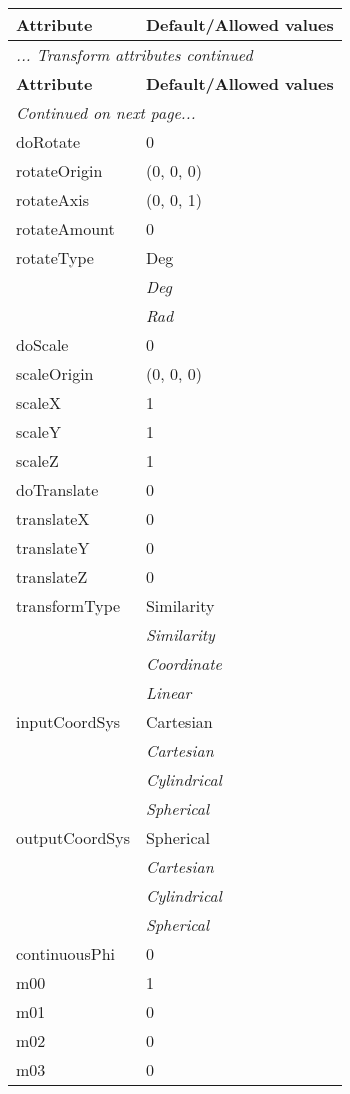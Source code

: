 \documentclass[10pt,a4paper]{report}
\begin{document}
\begin{longtable}{ll}
{\bf Attribute} & {\bf Default/Allowed values} \\
\hline \hline
\endfirsthead
\multicolumn{2}{l}{{\it ... Transform attributes continued}} \\
{\bf Attribute} & {\bf Default/Allowed values} \\
\hline \hline
\endhead
\hline
\multicolumn{2}{l}{{\it Continued on next page...}} \\
\endfoot
\hline
\endlastfoot

doRotate  &  0 \\
rotateOrigin  &  (0, 0, 0) \\
rotateAxis  &  (0, 0, 1) \\
rotateAmount  &  0 \\
rotateType  &  Deg   \\
 & {\it  Deg} \\
 & {\it  Rad} \\
doScale  &  0 \\
scaleOrigin  &  (0, 0, 0) \\
scaleX  &  1 \\
scaleY  &  1 \\
scaleZ  &  1 \\
doTranslate  &  0 \\
translateX  &  0 \\
translateY  &  0 \\
translateZ  &  0 \\
transformType  &  Similarity   \\
 & {\it  Similarity} \\
 & {\it  Coordinate} \\
 & {\it  Linear} \\
inputCoordSys  &  Cartesian   \\
 & {\it  Cartesian} \\
 & {\it  Cylindrical} \\
 & {\it  Spherical} \\
outputCoordSys  &  Spherical   \\
 & {\it  Cartesian} \\
 & {\it  Cylindrical} \\
 & {\it  Spherical} \\
continuousPhi  &  0 \\
m00  &  1 \\
m01  &  0 \\
m02  &  0 \\
m03  &  0 \\

\end{longtable}
\end{document}
